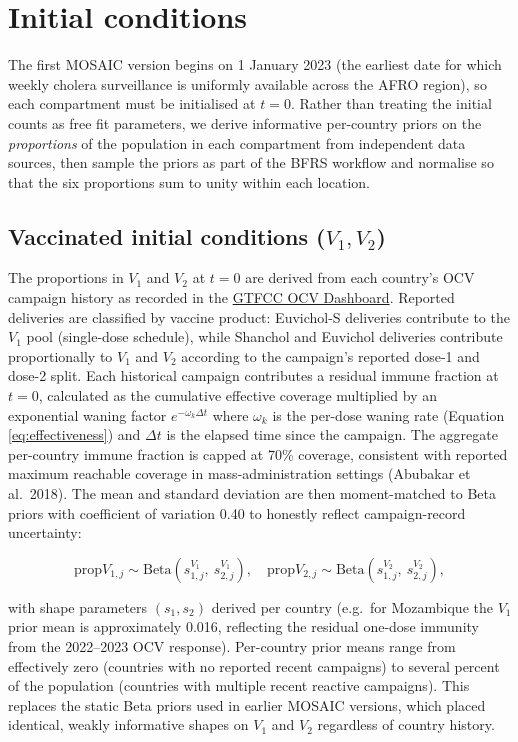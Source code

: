 \documentclass[
]{book}
\begin{document}
\section{Initial conditions}\label{initial-conditions}

The first MOSAIC version begins on 1 January 2023 (the earliest date for which weekly cholera surveillance is uniformly available across the AFRO region), so each compartment must be initialised at \(t = 0\). Rather than treating the initial counts as free fit parameters, we derive informative per-country priors on the \emph{proportions} of the population in each compartment from independent data sources, then sample the priors as part of the BFRS workflow and normalise so that the six proportions sum to unity within each location.

\subsection{\texorpdfstring{Vaccinated initial conditions (\(V_1, V_2\))}{Vaccinated initial conditions (V\_1, V\_2)}}\label{vaccinated-initial-conditions-v_1-v_2}

The proportions in \(V_1\) and \(V_2\) at \(t = 0\) are derived from each country's OCV campaign history as recorded in the \href{https://apps.epicentre-msf.org/public/app/gtfcc}{GTFCC OCV Dashboard}. Reported deliveries are classified by vaccine product: Euvichol-S deliveries contribute to the \(V_1\) pool (single-dose schedule), while Shanchol and Euvichol deliveries contribute proportionally to \(V_1\) and \(V_2\) according to the campaign's reported dose-1 and dose-2 split. Each historical campaign contributes a residual immune fraction at \(t = 0\), calculated as the cumulative effective coverage multiplied by an exponential waning factor \(e^{-\omega_k \Delta t}\) where \(\omega_k\) is the per-dose waning rate (Equation \eqref{eq:effectiveness}) and \(\Delta t\) is the elapsed time since the campaign. The aggregate per-country immune fraction is capped at 70\% coverage, consistent with reported maximum reachable coverage in mass-administration settings (Abubakar et al.~2018). The mean and standard deviation are then moment-matched to Beta priors with coefficient of variation 0.40 to honestly reflect campaign-record uncertainty:

\[
\text{prop}V_{1,j} \sim \text{Beta}(s_{1,j}^{V_1},\ s_{2,j}^{V_1}), \quad \text{prop}V_{2,j} \sim \text{Beta}(s_{1,j}^{V_2},\ s_{2,j}^{V_2}),
\]

with shape parameters \((s_1, s_2)\) derived per country (e.g.~for Mozambique the \(V_1\) prior mean is approximately 0.016, reflecting the residual one-dose immunity from the 2022--2023 OCV response). Per-country prior means range from effectively zero (countries with no reported recent campaigns) to several percent of the population (countries with multiple recent reactive campaigns). This replaces the static Beta priors used in earlier MOSAIC versions, which placed identical, weakly informative shapes on \(V_1\) and \(V_2\) regardless of country history.
\end{document}
